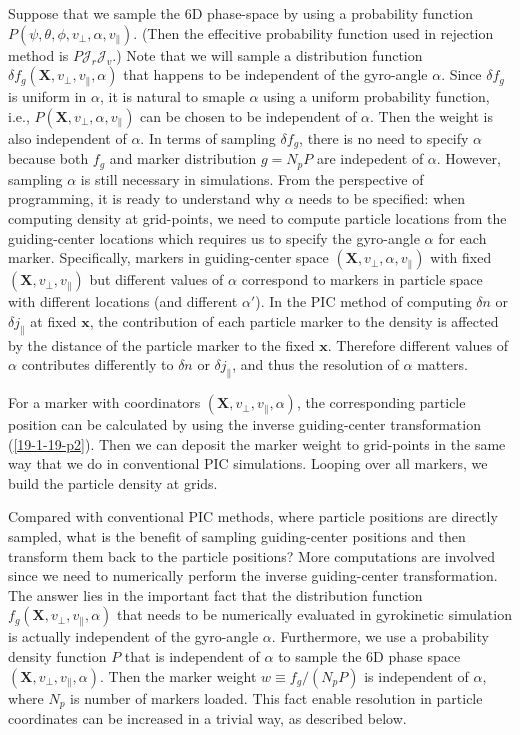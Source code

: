 \documentclass{article}
\begin{document}
Suppose that we sample the 6D phase-space by using a probability function $P
(\psi, \theta, \phi, v_{\perp}, \alpha, v_{\parallel})$. (Then the effecitive
probability function used in rejection method is $P \mathcal{J}_r
\mathcal{J}_v$.) Note that we will sample a distribution function $\delta f_g
(\mathbf{X}, v_{\perp}, v_{\parallel}, \alpha)$ that happens to be independent
of the gyro-angle $\alpha$. Since $\delta f_g$ is uniform in $\alpha$, it is
natural to smaple $\alpha$ using a uniform probability function, i.e., $P
(\mathbf{X}, v_{\perp}, \alpha, v_{\parallel})$ can be chosen to be
independent of $\alpha$. Then the weight is also independent of $\alpha$. In
terms of sampling $\delta f_g$, there is no need to specify $\alpha$ because
both $f_g$ and marker distribution $g = N_p P$ are indepedent of $\alpha$.
However, sampling $\alpha$ is still necessary in simulations. From the
perspective of programming, it is ready to understand why $\alpha$ needs to be
specified: when computing density at grid-points, we need to compute particle
locations from the guiding-center locations which requires us to specify the
gyro-angle $\alpha$ for each marker. Specifically, markers in guiding-center
space $(\mathbf{X}, v_{\perp}, \alpha, v_{\parallel})$ with fixed
$(\mathbf{X}, v_{\perp}, v_{\parallel})$ but different values of $\alpha$
correspond to markers in particle space with different locations (and
different $\alpha'$). In the PIC method of computing $\delta n$ or $\delta
j_{\parallel}$ at fixed $\mathbf{x}$, the contribution of each particle marker
to the density is affected by the distance of the particle marker to the fixed
$\mathbf{x}$. Therefore different values of $\alpha$ contributes differently
to $\delta n$ or $\delta j_{\parallel}$, and thus the resolution of $\alpha$
matters.

For a marker with coordinators $(\mathbf{X}, v_{\perp}, v_{\parallel},
\alpha)$, the corresponding particle position can be calculated by using the
inverse guiding-center transformation (\ref{19-1-19-p2}). Then we can deposit
the marker weight to grid-points in the same way that we do in conventional
PIC simulations. Looping over all markers, we build the particle density at
grids.

Compared with conventional PIC methods, where particle positions are directly
sampled, what is the benefit of sampling guiding-center positions and then
transform them back to the particle positions? More computations are involved
since we need to numerically perform the inverse guiding-center
transformation. The answer lies in the important fact that the distribution
function $f_g (\mathbf{X}, v_{\perp}, v_{\parallel}, \alpha)$ that needs to be
numerically evaluated in gyrokinetic simulation is actually independent of the
gyro-angle $\alpha$. Furthermore, we use a probability density function $P$
that is independent of $\alpha$ to sample the 6D phase space $(\mathbf{X},
v_{\perp}, v_{\parallel}, \alpha)$. Then the marker weight $w \equiv f_g /
(N_p P)$ is independent of $\alpha$, where $N_p$ is number of markers loaded.
This fact enable resolution in particle coordinates can be increased in a
trivial way, as described below.
\end{document}
